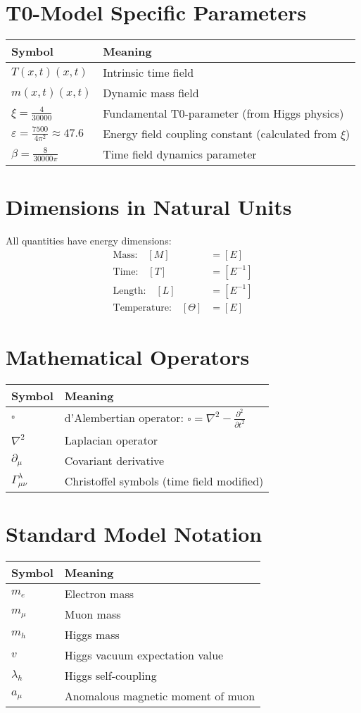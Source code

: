 \documentclass[12pt,a4paper]{report}
\newcommand{\Tfield}{T(x,t)}  %
\newcommand{\mfield}{m(x,t)}  %
\newcommand{\xipar}{\xi}      %
\begin{document}
	\section*{T0-Model Specific Parameters}
	\begin{tabular}{ll}
		\hline
		Symbol & Meaning \\
		\hline
		$\Tfield(x,t)$ & Intrinsic time field \\
		$\mfield(x,t)$ & Dynamic mass field \\
		$\xipar = \frac{4}{30000}$ & Fundamental T0-parameter (from Higgs physics) \\
		$\varepsilon = \frac{7500}{4\pi^2} \approx 47.6$ & Energy field coupling constant (calculated from $\xipar$) \\
		$\beta = \frac{8}{30000\pi}$ & Time field dynamics parameter \\
		\hline
	\end{tabular}
	
	\section*{Dimensions in Natural Units}
	All quantities have energy dimensions:
	\begin{align}
		\text{Mass:} \quad [M] &= [E] \\
		\text{Time:} \quad [T] &= [E^{-1}] \\
		\text{Length:} \quad [L] &= [E^{-1}] \\
		\text{Temperature:} \quad [\Theta] &= [E]
	\end{align}
	
	\section*{Mathematical Operators}
	\begin{tabular}{ll}
		\hline
		Symbol & Meaning \\
		\hline
		$\square$ & d'Alembertian operator: $\square = \nabla^2 - \frac{\partial^2}{\partial t^2}$ \\
		$\nabla^2$ & Laplacian operator \\
		$\partial_\mu$ & Covariant derivative \\
		$\Gamma^\lambda_{\mu\nu}$ & Christoffel symbols (time field modified) \\
		\hline
	\end{tabular}
	
	\section*{Standard Model Notation}
	\begin{tabular}{ll}
		\hline
		Symbol & Meaning \\
		\hline
		$m_e$ & Electron mass \\
		$m_\mu$ & Muon mass \\
		$m_h$ & Higgs mass \\
		$v$ & Higgs vacuum expectation value \\
		$\lambda_h$ & Higgs self-coupling \\
		$a_\mu$ & Anomalous magnetic moment of muon \\
		\hline
	\end{tabular}
\end{document}
